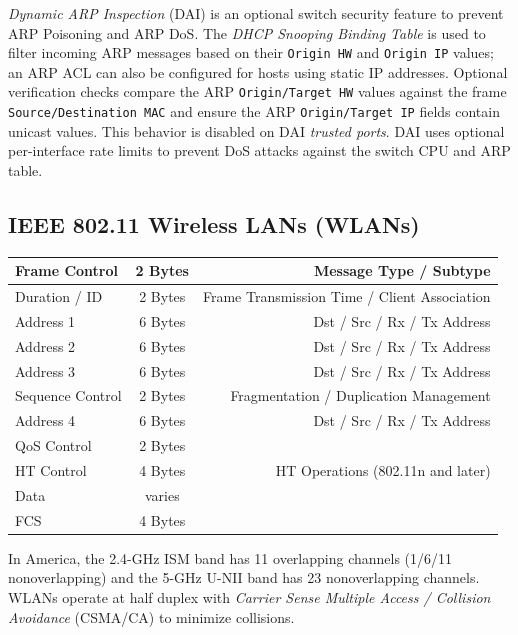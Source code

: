 \documentclass[12pt]{article}
\begin{document}
	\textit{Dynamic ARP Inspection} (DAI) is an optional switch security feature to prevent ARP Poisoning and ARP DoS. The \textit{DHCP Snooping Binding Table} is used to filter incoming ARP messages based on their \texttt{Origin HW} and \texttt{Origin IP} values; an ARP ACL can also be configured for hosts using static IP addresses. Optional verification checks compare the ARP \texttt{Origin/Target HW} values against the frame \texttt{Source/Destination MAC} and ensure the ARP \texttt{Origin/Target IP} fields contain unicast values. This behavior is disabled on DAI \textit{trusted ports}. DAI uses optional per-interface rate limits to prevent DoS attacks against the switch CPU and ARP table.


	\subsection[IEEE 802.11 WLANs]{IEEE 802.11 Wireless LANs (WLANs) \label{subsec:802.11 WLANS}}
	\begin{table}[H]
	\centering
	\begin{tabular}{| l | c | r |}\hline
	Frame Control		& 2 Bytes	& Message Type / Subtype\\\hline
	Duration / ID		& 2 Bytes	& Frame Transmission Time / Client Association\\\hline
	Address 1			& 6 Bytes	& Dst / Src / Rx / Tx Address\\\hline
	Address 2			& 6 Bytes	& Dst / Src / Rx / Tx Address\\\hline
	Address 3			& 6 Bytes	& Dst / Src / Rx / Tx Address\\\hline
	Sequence Control		& 2 Bytes	& Fragmentation / Duplication Management\\\hline
	Address 4			& 6 Bytes	& Dst / Src / Rx / Tx Address\\\hline
	QoS Control		& 2 Bytes	& \Cref{sec:QOS}\\\hline
	HT Control			& 4 Bytes	& HT Operations (802.11n and later)\\\hline
	Data				& varies	&\\\hline
	FCS				& 4 Bytes	&\\\hline
	\end{tabular}\end{table}
	In America, the 2.4-GHz ISM band has 11 overlapping channels (1/6/11 nonoverlapping) and the 5-GHz U-NII band has 23 nonoverlapping channels. WLANs operate at half duplex with \textit{Carrier Sense Multiple Access / Collision Avoidance} (CSMA/CA) to minimize collisions.
	
\end{document}
